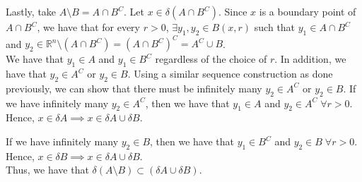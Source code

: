 \documentclass[12pt]{article}
\begin{document}
Lastly, take $A \setminus B = A \cap B^C$. Let $x \in \delta(A \cap B^C)$. Since $x$ is a boundary point of $A \cap B^C$, we have that for every $r > 0$, $\exists y_1, y_2 \in B(x, r)$ such that $y_1 \in A \cap B^C$ and $y_2 \in \mathbb{R}^n \setminus (A \cap B^C) = (A \cap B^C)^C = A^C \cup B$.\\

We have that $y_1 \in A$ and $y_1 \in B^C$ regardless of the choice of $r$. In addition, we have that $y_2 \in A^C$ or $y_2 \in B$. Using a similar sequence construction as done previously, we can show that there must be infinitely many $y_2 \in A^C$ or $y_2 \in B$. If we have infinitely many $y_2 \in A^C$, then we have that $y_1 \in A$ and $y_2 \in A^C \; \forall r > 0$. Hence, $x \in \delta A \implies x \in \delta A \cup \delta B$.

If we have infinitely many $y_2 \in B$, then we have that $y_1 \in B^C$ and $y_2 \in B \; \forall r > 0$. Hence, $x \in \delta B \implies x \in \delta A \cup \delta B$.\\

Thus, we have that $\delta(A \setminus B) \subset (\delta A \cup \delta B)$.
\end{document}
